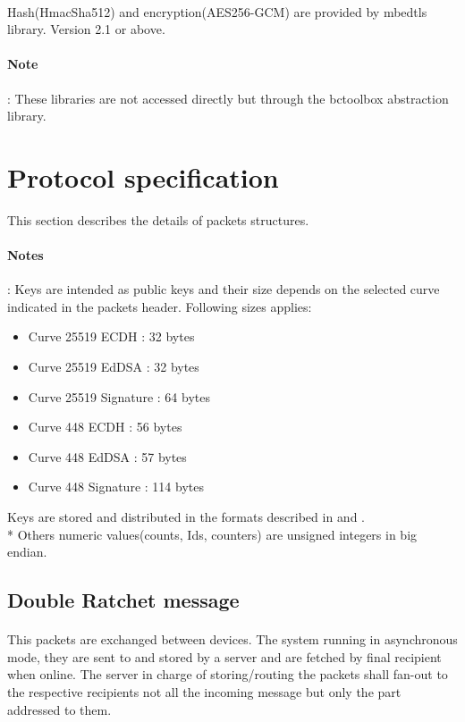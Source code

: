 \documentclass[a4paper,11pt]{article}
\begin{document}
    \paragraph{}Hash(HmacSha512) and encryption(AES256-GCM) are provided by mbedtls library\cite{libmbedtls}. Version 2.1 or above.
    \paragraph{Note}: These libraries are not accessed directly but through the bctoolbox abstraction library.

\section{Protocol specification}
  This section describes the details of packets structures.
  \paragraph*{Notes}: Keys are intended as public keys and their size depends on the selected curve indicated in the packets header. Following sizes applies:
  \begin{itemize}
    \item Curve 25519 ECDH : 32 bytes
    \item Curve 25519 EdDSA : 32 bytes
    \item Curve 25519 Signature : 64 bytes
    \item Curve 448 ECDH : 56 bytes
    \item Curve 448 EdDSA : 57 bytes
    \item Curve 448 Signature : 114 bytes
  \end{itemize}
  Keys are stored and distributed in the formats described in \cite{rfc7748} and \cite{rfc8032}.\\*
  Others numeric values(counts, Ids, counters) are unsigned integers in big endian.
  
  \subsection{Double Ratchet message}
    \label{subsec:protocol_doubleratchet}
    \paragraph*{}This packets are exchanged between devices. The system running in asynchronous mode, they are sent to and stored by a server and are fetched by final recipient when online. The server in charge of storing/routing the packets shall fan-out to the respective recipients not all the incoming message but only the part addressed to them.
\end{document}
